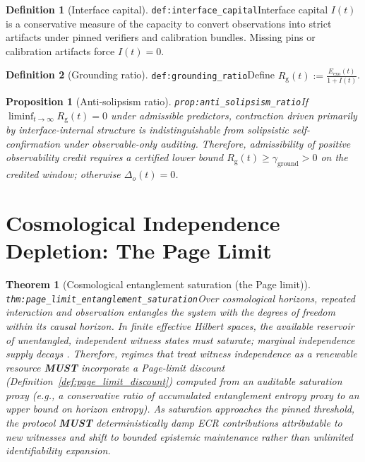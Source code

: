 \documentclass[11pt]{article}
\theoremstyle{definition}
\newtheorem{definition}{Definition}
\theoremstyle{plain}
\newtheorem{proposition}{Proposition}
\newtheorem{theorem}{Theorem}
\newcommand{\MUST}{\textbf{MUST}}
\newcommand{\lbl}[1]{\texttt{\footnotesize\nolinkurl{#1}}}
\newcommand{\DefLabel}[1]{\hfill{\small\lbl{#1}}}
\newcommand{\deltao}{\Delta_o}
\newcommand{\gground}{\gamma_{\mathrm{ground}}}
\newcommand{\Rg}{R_{\mathrm{g}}}
\begin{document}
\begin{definition}[Interface capital]\DefLabel{def:interface_capital}\label{def:interface_capital}
Interface capital $I(t)$ is a conservative measure of the capacity to convert observations into strict artifacts under pinned verifiers and calibration bundles.
Missing pins or calibration artifacts force $I(t)=0$.
\end{definition}

\begin{definition}[Grounding ratio]\DefLabel{def:grounding_ratio}\label{def:grounding_ratio}
Define $\Rg(t):=\frac{E_{\mathrm{exo}}(t)}{1+I(t)}$.
\end{definition}

\begin{proposition}[Anti-solipsism ratio]\DefLabel{prop:anti_solipsism_ratio}\label{prop:anti_solipsism_ratio}
If $\liminf_{t\to\infty} \Rg(t)=0$ under admissible predictors, contraction driven primarily by interface-internal structure is indistinguishable from solipsistic self-confirmation under observable-only auditing.
Therefore, admissibility of positive observability credit requires a certified lower bound $\Rg(t)\ge \gground>0$ on the credited window; otherwise $\deltao(t)=0$.
\end{proposition}

\section{Cosmological Independence Depletion: The Page Limit}\label{sec:page}
\begin{theorem}[Cosmological entanglement saturation (the Page limit)]\DefLabel{thm:page_limit_entanglement_saturation}\label{thm:page_limit_entanglement_saturation}
Over cosmological horizons, repeated interaction and observation entangles the system with the degrees of freedom within its causal horizon.
In finite effective Hilbert spaces, the available reservoir of unentangled, independent witness states must saturate; marginal independence supply decays \cite{Page1993AverageEntropy}.
Therefore, regimes that treat witness independence as a renewable resource \MUST{} incorporate a Page-limit discount (Definition~\ref{def:page_limit_discount}) computed from an auditable saturation proxy (e.g., a conservative ratio of accumulated entanglement entropy proxy to an upper bound on horizon entropy).
As saturation approaches the pinned threshold, the protocol \MUST{} deterministically damp ECR contributions attributable to new witnesses and shift to bounded epistemic maintenance rather than unlimited identifiability expansion.
\end{theorem}
\end{document}
